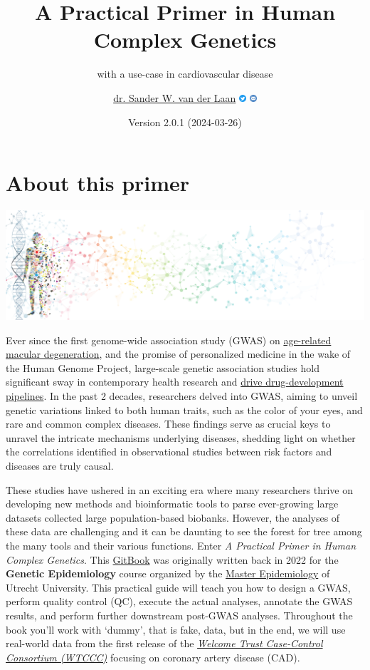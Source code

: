 \documentclass[
]{book}
\title{A Practical Primer in Human Complex Genetics}
\subtitle{with a use-case in cardiovascular disease}
\author{\href{https://vanderlaanand.science}{dr. Sander W. van der Laan} \href{https://www.twitter.com/swvanderlaan}{\includegraphics[width=0.02\textwidth,height=\textheight]{./img/_logo/twitter_circle_blue.png}} \href{mailto:s.w.vanderlaan@gmail.com}{\includegraphics[width=0.02\textwidth,height=\textheight]{./img/_logo/email_circle_blue.png}}}
\date{Version 2.0.1 (2024-03-26)}
\begin{document}
\maketitle

{
\setcounter{tocdepth}{1}
\tableofcontents
}
\hypertarget{about-this-primer}{%
\chapter{About this primer}\label{about-this-primer}}

\includegraphics[width=1\textwidth,height=\textheight]{./img/_headers/banner_man_standing_dna.png}

Ever since the first genome-wide association study (GWAS) on \href{https://doi.org/10.1126/science.1109557}{age-related macular degeneration}, and the promise of personalized medicine in the wake of the Human Genome Project, large-scale genetic association studies hold significant sway in contemporary health research and \href{http://dx.doi.org/10.1038/nrd.2017.262}{drive drug-development pipelines}. In the past 2 decades, researchers delved into GWAS, aiming to unveil genetic variations linked to both human traits, such as the color of your eyes, and rare and common complex diseases. These findings serve as crucial keys to unravel the intricate mechanisms underlying diseases, shedding light on whether the correlations identified in observational studies between risk factors and diseases are truly causal.

These studies have ushered in an exciting era where many researchers thrive on developing new methods and bioinformatic tools to parse ever-growing large datasets collected large population-based biobanks. However, the analyses of these data are challenging and it can be daunting to see the forest for tree among the many tools and their various functions. Enter \emph{A Practical Primer in Human Complex Genetics}. This \href{https://cjvanlissa.github.io/gitbook-demo/}{GitBook} was originally written back in 2022 for the \textbf{Genetic Epidemiology} course organized by the \href{https://epidemiology-education.nl}{Master Epidemiology} of Utrecht University. This practical guide will teach you how to design a GWAS, perform quality control (QC), execute the actual analyses, annotate the GWAS results, and perform further downstream post-GWAS analyses. Throughout the book you'll work with `dummy', that is fake, data, but in the end, we will use real-world data from the first release of the \href{https://www.wtccc.org.uk/ccc1/overview.html}{\emph{Welcome Trust Case-Control Consortium (WTCCC)}} focusing on coronary artery disease (CAD).
\end{document}
